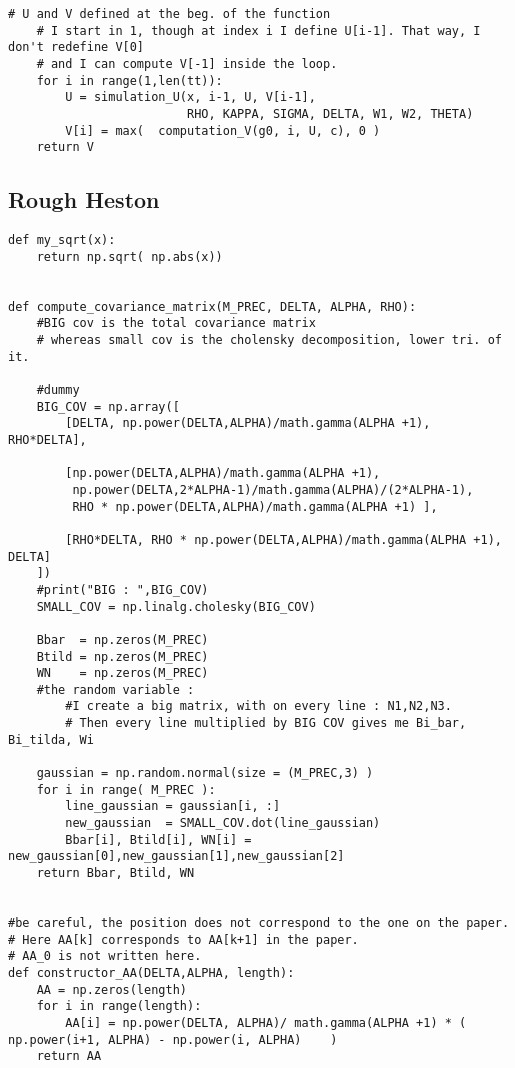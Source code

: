 \begin{Verbatim}[fontsize=\tiny]
    # U and V defined at the beg. of the function
    # I start in 1, though at index i I define U[i-1]. That way, I don't redefine V[0]
    # and I can compute V[-1] inside the loop.
    for i in range(1,len(tt)):
        U = simulation_U(x, i-1, U, V[i-1],
                         RHO, KAPPA, SIGMA, DELTA, W1, W2, THETA)
        V[i] = max(  computation_V(g0, i, U, c), 0 )
    return V
\end{Verbatim}

\subsection{Rough Heston}
\begin{Verbatim}[fontsize=\tiny]
def my_sqrt(x):
    return np.sqrt( np.abs(x))


def compute_covariance_matrix(M_PREC, DELTA, ALPHA, RHO):
    #BIG cov is the total covariance matrix
    # whereas small cov is the cholensky decomposition, lower tri. of it.

    #dummy
    BIG_COV = np.array([
        [DELTA, np.power(DELTA,ALPHA)/math.gamma(ALPHA +1), RHO*DELTA],

        [np.power(DELTA,ALPHA)/math.gamma(ALPHA +1),
         np.power(DELTA,2*ALPHA-1)/math.gamma(ALPHA)/(2*ALPHA-1),
         RHO * np.power(DELTA,ALPHA)/math.gamma(ALPHA +1) ],

        [RHO*DELTA, RHO * np.power(DELTA,ALPHA)/math.gamma(ALPHA +1), DELTA]
    ])
    #print("BIG : ",BIG_COV)
    SMALL_COV = np.linalg.cholesky(BIG_COV)

    Bbar  = np.zeros(M_PREC)
    Btild = np.zeros(M_PREC)
    WN    = np.zeros(M_PREC)
    #the random variable :
        #I create a big matrix, with on every line : N1,N2,N3.
        # Then every line multiplied by BIG COV gives me Bi_bar, Bi_tilda, Wi

    gaussian = np.random.normal(size = (M_PREC,3) )
    for i in range( M_PREC ):
        line_gaussian = gaussian[i, :]
        new_gaussian  = SMALL_COV.dot(line_gaussian)
        Bbar[i], Btild[i], WN[i] = new_gaussian[0],new_gaussian[1],new_gaussian[2]
    return Bbar, Btild, WN


#be careful, the position does not correspond to the one on the paper.
# Here AA[k] corresponds to AA[k+1] in the paper.
# AA_0 is not written here.
def constructor_AA(DELTA,ALPHA, length):
    AA = np.zeros(length)
    for i in range(length):
        AA[i] = np.power(DELTA, ALPHA)/ math.gamma(ALPHA +1) * ( np.power(i+1, ALPHA) - np.power(i, ALPHA)    )
    return AA


\end{Verbatim}
